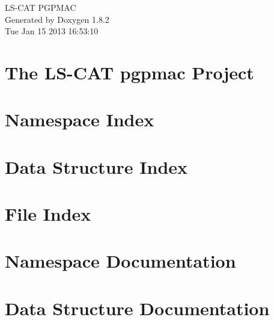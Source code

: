 \documentclass{book}
\begin{document}
\hypersetup{pageanchor=false,citecolor=blue}
\begin{titlepage}
\vspace*{7cm}
\begin{center}
{\Large L\-S-\/\-C\-A\-T P\-G\-P\-M\-A\-C }\\
\vspace*{1cm}
{\large Generated by Doxygen 1.8.2}\\
\vspace*{0.5cm}
{\small Tue Jan 15 2013 16:53:10}\\
\end{center}
\end{titlepage}
\clearemptydoublepage
{}
\tableofcontents
\clearemptydoublepage
{}
\hypersetup{pageanchor=true,citecolor=blue}
\chapter{The L\-S-\/\-C\-A\-T pgpmac Project}
\label{index}\hypertarget{index}{}
\chapter{Namespace Index}

\chapter{Data Structure Index}

\chapter{File Index}

\chapter{Namespace Documentation}


\chapter{Data Structure Documentation}

























\end{document}
